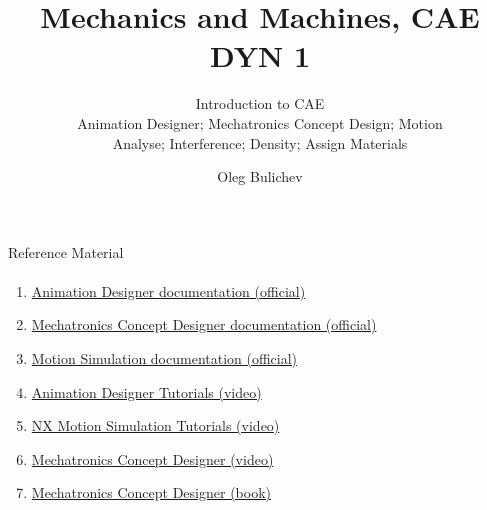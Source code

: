\documentclass[aspectratio=169]{beamer}
\title[MaM]{Mechanics and Machines, CAE DYN 1} %
\subtitle{Introduction to CAE  
\\ Animation Designer; Mechatronics Concept Design; Motion 
\\ Analyse; Interference; Density; Assign Materials
    } %
\author{Oleg Bulichev}
\newcommand{\fbckg}[1]{\usebackgroundtemplate{\texttt{[image: \#1]}}}%
\begin{document}
\setlength{\abovedisplayskip}{0pt}
\setlength{\belowdisplayskip}{0pt}
\setlength{\abovedisplayshortskip}{0pt}
\setlength{\belowdisplayshortskip}{0pt}

\fbckg{fibeamer/figs/title_page.png}

\fbckg{fibeamer/figs/common.png}

\note{\scriptsize
\ 
}



\begin{frame}[t]{Reference Material}
\framesubtitle{}
\footnotesize
\begin{enumerate}
    \item \href{https://docs.sw.siemens.com/en-US/doc/209349590/PL20200605195244930.motion_designer/xid1334514}{Animation Designer documentation (official)}
    \item \href{https://docs.sw.siemens.com/en-US/doc/209349590/PL20200605195244930.mechatronics/id1101745}{Mechatronics Concept Designer documentation (official)}
    \item \href{https://docs.sw.siemens.com/en-US/doc/289054037/PL20201105153211099.motion/id563951}{Motion Simulation documentation (official)}
    \item \href{https://www.youtube.com/playlist?list=PLY2AphaX4SYcoXBPIjkHmph8JAtYcI90L}{Animation Designer Tutorials (video)}
    \item \href{https://www.youtube.com/playlist?list=PLY8N5WFx1MGAsxH7G49ey37QC_nFtQ72E}{NX Motion Simulation Tutorials (video)}
    \item \href{https://www.youtube.com/playlist?list=PLO4e9B3weuKLBmu6BEQkx3K7wE9GB_LL3}{Mechatronics Concept Designer (video)}
    \item \href{http://www2.me.rochester.edu/courses/ME204/nx_help/en_US/graphics/fileLibrary/nx/mechtronics/MCD_Quick_Start.pdf}{Mechatronics Concept Designer (book)}
\end{enumerate}
    
\end{frame}

\fbckg{fibeamer/figs/last_page.png}
\frame[plain]{}
\end{document}
